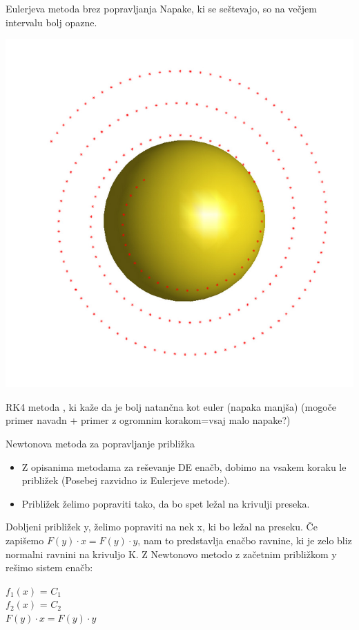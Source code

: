 \documentclass{beamer}
\begin{document}
\begin{frame}{Eulerjeva metoda brez popravljanja}
	Napake, ki se seštevajo, so na večjem intervalu bolj opazne.\\
	\begin{center}
		\includegraphics[scale=0.30]{eul2}
	\end{center}	
\end{frame}

\begin{frame}{RK4 metoda}
	, ki kaže da je bolj natančna kot euler (napaka manjša) (mogoče primer navadn + primer z ogromnim korakom=vsaj malo napake?)
\end{frame}

\begin{frame}{Newtonova metoda za popravljanje približka}
 \begin{itemize}
    \item Z opisanima metodama za reševanje DE enačb, dobimo na vsakem koraku le približek (Posebej razvidno iz Eulerjeve metode).
    \item Približek želimo popraviti tako, da bo spet ležal na krivulji preseka.
 \end{itemize}
 Dobljeni približek y, želimo popraviti na nek x, ki bo ležal na preseku. Če zapišemo $F(y) \cdot x = F(y)\cdot y $, nam to predstavlja enačbo ravnine, ki je zelo bliz normalni ravnini na krivuljo K. Z Newtonovo metodo z začetnim približkom y rešimo sistem enačb:
  \begin{center}
		$f_{1}(x)$ = $C_{1}$\\$f_{2}(x)$ = $C_{2}$\\ $F(y) \cdot x = F(y)\cdot y $
	\end{center}
\end{frame}
\end{document}
